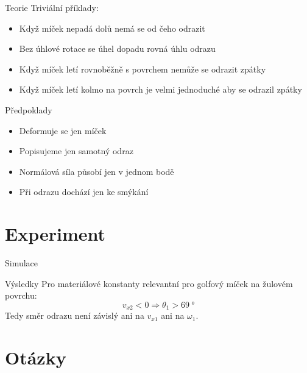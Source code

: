 \documentclass[secheader]{beamer}
\begin{document}
 \begin{frame}{Teorie}
  Triviální příklady:
  \begin{itemize}
   \item Když míček nepadá dolů nemá se od čeho odrazit 
   \item Bez úhlové rotace se úhel dopadu rovná úhlu odrazu
   \item Když míček letí rovnoběžně s povrchem nemůže se odrazit zpátky
   \item Když míček letí kolmo na povrch je velmi jednoduché aby se odrazil
    zpátky
  \end{itemize}
 \end{frame}

 \begin{frame}{Předpoklady}
 \begin{itemize}
  \item Deformuje se jen míček
  \item Popisujeme jen samotný odraz
  \item Normálová síla působí jen v jednom bodě
  \item Při odrazu dochází jen ke smýkání 
 \end{itemize}
\end{frame}

\section{Experiment}

\begin{frame}{Simulace}
 \centering

\end{frame}

 \begin{frame}{Výsledky}
 Pro materiálové konstanty relevantní pro golfový míček na žulovém povrchu:
 \[
  v_{x2} < 0 \Rightarrow \theta_1 > \qty{69}{\degree}
 \]
 Tedy směr odrazu není závislý ani na $v_{x1}$ ani na $\omega_1$.
\end{frame}

\section{Otázky}
\end{document}
